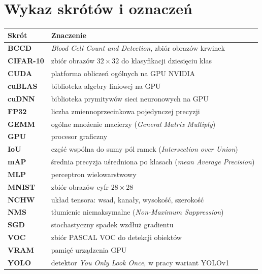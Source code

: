 \chapter*{Wykaz skrótów i oznaczeń}
{}

\begin{tabular}{@{}>{\bfseries}l p{}@{}}
\toprule
Skrót & Znaczenie \\
\midrule
BCCD & \textit{Blood Cell Count and Detection}, zbiór obrazów krwinek \\
CIFAR-10 & zbiór obrazów $32\times 32$ do klasyfikacji dziesięciu klas \\
CUDA & platforma obliczeń ogólnych na GPU NVIDIA \\
cuBLAS & biblioteka algebry liniowej na GPU \\
cuDNN & biblioteka prymitywów sieci neuronowych na GPU \\
FP32 & liczba zmiennoprzecinkowa pojedynczej precyzji \\
GEMM & ogólne mnożenie macierzy (\textit{General Matrix Multiply}) \\
GPU & procesor graficzny \\
IoU & część wspólna do sumy pól ramek (\textit{Intersection over Union}) \\
mAP & średnia precyzja uśredniona po klasach (\textit{mean Average Precision}) \\
MLP & perceptron wielowarstwowy \\
MNIST & zbiór obrazów cyfr $28\times 28$ \\
NCHW & układ tensora: wsad, kanały, wysokość, szerokość \\
NMS & tłumienie niemaksymalne (\textit{Non-Maximum Suppression}) \\
SGD & stochastyczny spadek wzdłuż gradientu \\
VOC & zbiór PASCAL VOC do detekcji obiektów \\
VRAM & pamięć urządzenia GPU \\
YOLO & detektor \textit{You Only Look Once}, w pracy wariant YOLOv1 \\
\bottomrule
\end{tabular}
